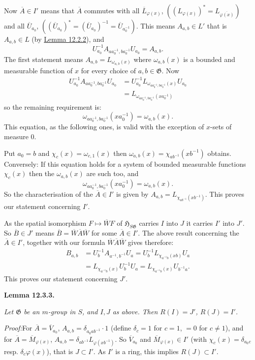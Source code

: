 \documentclass[12pt,b5paper,twoside]{article}
\newcommand{\Hspace}{\mathfrak H}
\newcommand{\Lemma}[1]{%
  \par\smallskip\noindent\phantomsection\label{lem:#1}\textbf{Lemma #1.}\enspace
}
\newcommand{\Proof}{\par\noindent\textit{Proof:}\enspace}
\newcommand{\lemref}[1]{\hyperref[lem:#1]{Lemma #1}}
\begin{document}
Now $\overline A\in I'$ means that $\overline A$ commutes with all
$\overline L_{\varphi(x)}$,
$((L_{\varphi(x)})^*=L_{\overline{\varphi(x)}})$ and all
$\overline U_{a_0}$,
$((\overline U_{a_0})^*=(\overline U_{a_0})^{-1}
=\overline U_{a_0^{-1}})$. This means $A_{a,b}\in L'$ that is
$A_{a,b}\in L$ (by \lemref{12.2.2}), and
\[
 U_{a_0}^{-1}A_{aa_0^{-1},ba_0^{-1}}U_{a_0}=A_{a,b}.
\]
The first statement means $A_{a,b}=L_{\omega_{a,b}(x)}$ where
$\omega_{a,b}(x)$ is a bounded and measurable function of $x$ for every
choice of $a,b\in\mathfrak G$. Now
\begin{align*}
 U_{a_0}^{-1}A_{aa_0^{-1},ba_0^{-1}}U_{a_0}
 &=U_{a_0}^{-1}L_{\omega_{aa_0^{-1},ba_0^{-1}}(x)}U_{a_0}\\
 &=L_{\omega_{aa_0^{-1},ba_0^{-1}}(xa_0^{-1})}
\end{align*}
so the remaining requirement is:
\[
 \omega_{aa_0^{-1},ba_0^{-1}}(xa_0^{-1})=\omega_{a,b}(x).
\]
This equation, as the following ones, is valid with the exception of $x$-sets
of measure $0$.

Put $a_0=b$ and $\chi_c(x)=\omega_{c,1}(x)$ then
$\omega_{a,b}(x)=\chi_{ab^{-1}}(xb^{-1})$ obtains. Conversely: If this
equation holds for a system of bounded measurable functions $\chi_c(x)$ then
the $\omega_{a,b}(x)$ are such too, and
\[
 \omega_{aa_0^{-1},ba_0^{-1}}(xa_0^{-1})=\omega_{a,b}(x).
\]
So the characterisation of the $\overline A\in I'$ is given by
$A_{a,b}=L_{\chi_{ab^{-1}}(xb^{-1})}$. This proves our statement concerning
$I'$.

As the spatial isomorphism $F\mapsto\overline WF$ of
$\Hspace_{S\mathfrak G}$ carries $I$ into $J$ it carries $I'$ into $J'$. So
$\overline B\in J'$ means $\overline B=\overline W\overline A\overline W$
for some $\overline A\in I'$. The above result concerning the
$\overline A\in I'$, together with our formula
$\overline W\overline A\overline W$ gives therefore:
\begin{align*}
 B_{a,b}
 &=U_b^{-1}A_{a^{-1},b^{-1}}U_a
 =U_b^{-1}L_{\chi_{a^{-1}b}(xb)}U_a\\
 &=L_{\chi_{a^{-1}b}(x)}U_b^{-1}U_a
 =L_{\chi_{a^{-1}b}(x)}U_{b^{-1}a}.
\end{align*}
This proves our statement concerning $J'$.

\Lemma{12.3.3}
\emph{Let $\mathfrak G$ be an $m$-group in $S$, and $I,J$ as above. Then
$R(I)=J'$, $R(J)=I'$.}

\Proof For $\overline A=\overline V_{a_0}$,
$A_{a,b}=\delta_{a_0ab^{-1}}\cdot1$ (define
$\delta_c=1$ for $c=1$, $=0$ for $c\neq1$), and for
$\overline A=\overline M_{\varphi(x)}$,
$A_{a,b}=\delta_{ab^{-1}}L_{\varphi(xb^{-1})}$. So
$\overline V_{a_0}$ and $\overline M_{\varphi(x)}\in I'$ (with
$\chi_c(x)=\delta_{a_0c}$ resp. $\delta_c\varphi(x)$), that is $J\subset I'$.
As $I'$ is a ring, this implies $R(J)\subset I'$.
\end{document}
